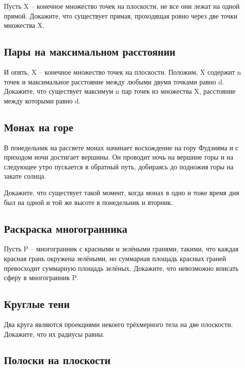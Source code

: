 Пусть X -- конечное множество точек на плоскости, не все они лежат на одной прямой.
Докажите, что существует прямая, проходящая ровно через две точки множества X.




\subsection*{Пары на максимальном расстоянии}%


И опять, X -- конечное множество точек на плоскости.
Положим,  X содержит n точек и максимальное расстояние между любыми двумя точками равно d.
Докажите, что существует максимум n пар точек из множества X, расстояние между которыми равно d.




\subsection*{Монах на горе}%


 В понедельник на рассвете монах начинает восхождение на гору Фудзияма и с приходом ночи достигает вершины.
Он проводит ночь на вершине горы и на следующее утро пускается в обратный путь, добираясь до подножия горы на закате солнца.


  Докажите, что существует такой момент, когда монах в одно и тоже время дня был на одной и той же высоте в понедельник и вторник.


\subsection*{Раскраска многогранника}%


Пусть P -- многогранник с красными и зелёными гранями, такими, что каждая красная грань окружена зелёными, но  суммарная площадь красных граней превосходит суммарную площадь зелёных.
Докажите, что невозможно вписать сферу в многогранник P.




\subsection*{Круглые тени}%


Два круга являются проекциями некоего трёхмерного тела на две плоскости.
Докажите, что их радиусы равны.




\subsection*{Полоски на плоскости}%


